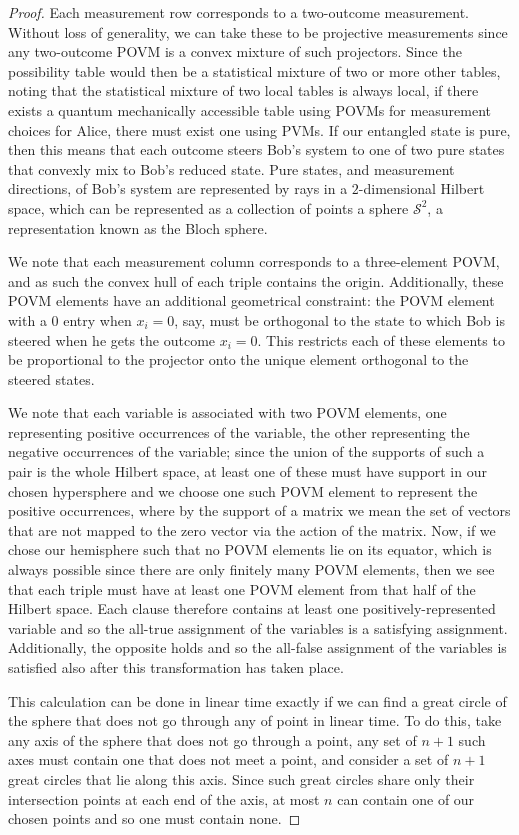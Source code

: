 \documentclass[reprint]{revtex4-1}
\theoremstyle{definition}
\begin{document}
\begin{proof}
Each measurement row corresponds to a two-outcome measurement. Without loss of generality, we can take these to be projective measurements since any two-outcome POVM is a convex mixture of such projectors. Since the possibility table would then be a statistical mixture of two or more other tables, noting that the statistical mixture of two local tables is always local, if there exists a quantum mechanically accessible table using POVMs for measurement choices for Alice, there must exist one using PVMs. If our entangled state is pure, then this means that each outcome steers Bob's system to one of two pure states that convexly mix to Bob's reduced state. Pure states, and measurement directions, of Bob's system are represented by rays in a $2$-dimensional Hilbert space, which can be represented as a collection of points a sphere $\mathcal{S}^2$, a representation known as the Bloch sphere.

We note that each measurement column corresponds to a three-element POVM, and as such the convex hull of each triple contains the origin. Additionally, these POVM elements have an additional geometrical constraint: the POVM element with a 0 entry when $x_i=0$, say, must be orthogonal to the state to which Bob is steered when he gets the outcome $x_i=0$. This restricts each of these elements to be proportional to the projector onto the unique element orthogonal to the steered states.

We note that each variable is associated with two POVM elements, one representing positive occurrences of the variable, the other representing the negative occurrences of the variable; since the union of the supports of such a pair is the whole Hilbert space, at least one of these must have support in our chosen hypersphere and we choose one such POVM element to represent the positive occurrences, where by the support of a matrix we mean the set of vectors that are not mapped to the zero vector via the action of the matrix. Now, if we chose our hemisphere such that no POVM elements lie on its equator, which is always possible since there are only finitely many POVM elements, then we see that each triple must have at least one POVM element from that half of the Hilbert space. Each clause therefore contains at least one positively-represented variable and so the all-true assignment of the variables is a satisfying assignment. Additionally, the opposite holds and so the all-false assignment of the variables is satisfied also after this transformation has taken place.

This calculation can be done in linear time exactly if we can find a great circle of the sphere that does not go through any of point in linear time. To do this, take any axis of the sphere that does not go through a point, any set of $n+1$ such axes must contain one that does not meet a point, and consider a set of $n+1$ great circles that lie along this axis. Since such great circles share only their intersection points at each end of the axis, at most $n$ can contain one of our chosen points and so one must contain none.
\end{proof}
\end{document}

